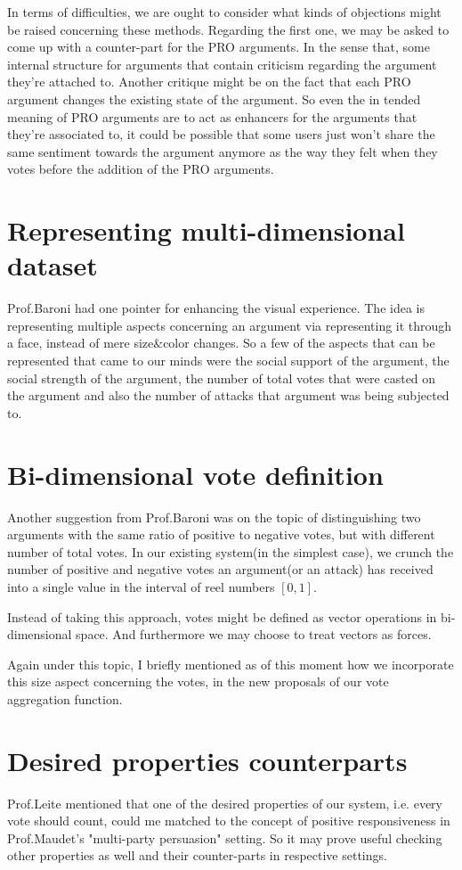\documentclass{article}
\begin{document}
In terms of difficulties, we are ought to consider what kinds of objections might be raised concerning these methods. Regarding the first one, we may be asked to come up with a counter-part for the PRO arguments. In the sense that,  some internal structure for arguments that contain criticism regarding the argument they're attached to. Another critique might be on the fact that each PRO argument changes the existing state of the argument. So even the in tended meaning of PRO arguments are to act as enhancers for the arguments that they're associated to, it could be possible that some users just won't share the same sentiment towards the argument anymore as the way they felt when they votes before the addition of the PRO arguments. 

\section{Representing multi-dimensional dataset} 
Prof.Baroni had one pointer for enhancing the visual experience. The idea is representing multiple aspects concerning an argument via representing it through a face, instead of mere size\&color changes.
So a few of the aspects that can be represented that came to our minds were the social support of the argument, the social strength of the argument, the number of total votes that were casted on the argument and also the number of attacks that argument was being subjected to.

\section{Bi-dimensional vote definition}
Another suggestion from Prof.Baroni was on the topic of distinguishing two arguments with the same ratio of positive to negative votes, but with different number of total votes. In our existing system(in the simplest case), we crunch the number of positive and negative votes an argument(or an attack) has received into a single value in the interval of reel numbers $[0,1]$.

Instead of taking this approach, votes might be defined as vector operations in bi-dimensional space. And furthermore we may choose to treat vectors as forces.

Again under this topic, I briefly mentioned as of this moment how we incorporate this size aspect concerning the votes, in the new proposals of our vote aggregation function.


\section{Desired properties counterparts}
Prof.Leite mentioned that one of the desired properties of our system, i.e. every vote should count, could me matched to the concept of positive responsiveness in Prof.Maudet's "multi-party persuasion" setting. So it may prove useful checking other properties as well and their counter-parts in respective settings. 
\end{document}
